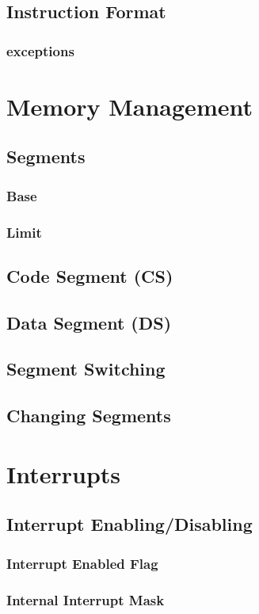 \documentclass[oneside, a4paper]{memoir}
\begin{document}
\section{Instruction Format}
\subsection{exceptions}

\chapter{Memory Management}
\label{ch:Memory Management}
\section{Segments}
\subsection{Base}
\subsection{Limit}
\section{Code Segment (CS)}
\section{Data Segment (DS)}
\section{Segment Switching}
\section{Changing Segments}

\chapter{Interrupts}
\label{ch:Interrupts}
\section{Interrupt Enabling/Disabling}
\label{sec:Interrupt Enabling/Disabling}
\subsection{Interrupt Enabled Flag}
\subsection{Internal Interrupt Mask}
\end{document}
